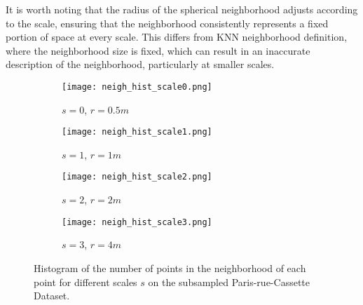 \documentclass{article}
\begin{document}
It is worth noting that the radius of the spherical neighborhood adjusts according to the scale, ensuring that the neighborhood consistently represents a fixed portion of space at every scale. This differs from KNN neighborhood definition, where the neighborhood size is fixed, which can result in an inaccurate description of the neighborhood, particularly at smaller scales.

\begin{figure}
    \begin{subfigure}{0.5\textwidth}
        \centering
        \texttt{[image: neigh\_hist\_scale0.png]}
        \caption{$s=0$, $r=0.5m$}
    \end{subfigure}
    \hfill
    \begin{subfigure}{0.5\textwidth}
        \centering
        \texttt{[image: neigh\_hist\_scale1.png]}
        \caption{$s=1$, $r=1m$}
    \end{subfigure}
    \hfill
    \begin{subfigure}{0.5\textwidth}
        \centering
        \texttt{[image: neigh\_hist\_scale2.png]}
        \caption{$s=2$, $r=2m$}
    \end{subfigure}
    \hfill
    \begin{subfigure}{0.5\textwidth}
        \centering
        \texttt{[image: neigh\_hist\_scale3.png]}
        \caption{$s=3$, $r=4m$}
    \end{subfigure}
    \caption{Histogram of the number of points in the neighborhood of each point for different scales $s$ on the subsampled Paris-rue-Cassette Dataset.}
    \label{fig:neigh_hist}
\end{figure}
\end{document}
